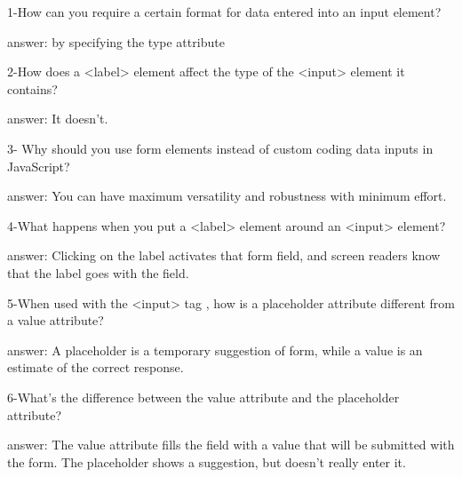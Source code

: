 1-How can you require a certain format for data entered into an input element?

answer: by specifying the type attribute

2-How does a <label> element affect the type of the <input> element it contains?

answer: It doesn't.

3- Why should you use form elements instead of custom coding data inputs in JavaScript?

answer: You can have maximum versatility and robustness with minimum effort.

4-What happens when you put a <label> element around an <input> element?

answer: Clicking on the label activates that form field, and screen readers know that the label goes with the field.

5-When used with the <input> tag , how is a placeholder attribute different from a value attribute?

answer: A placeholder is a temporary suggestion of form, while a value is an estimate of the correct response.

6-What's the difference between the value attribute and the placeholder attribute?

answer: The value attribute fills the field with a value that will be submitted with the form. The placeholder shows a suggestion, but doesn't really enter it.
